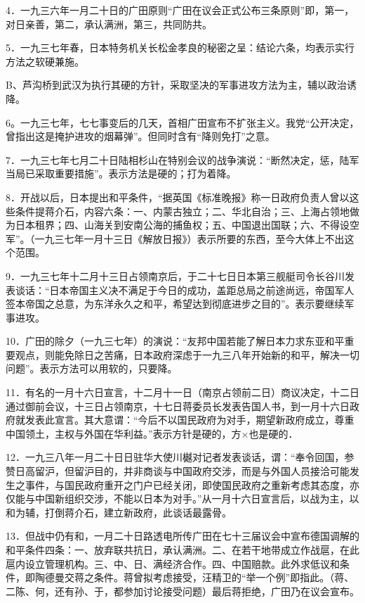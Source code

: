 4．一九三六年一月二十日的广田原则“广田在议会正式公布三条原则”即，第一，对日亲善，第二，承认满洲，第三，共同防共。

5．一九三七年春，日本特务机关长松金孝良的秘密之呈：结论六条，均表示实行方法之软硬兼施。

B、芦沟桥到武汉为执行其硬的方针，采取坚决的军事进攻方法为主，辅以政治诱降。

6。一九三七年，七七事变后的几天，首相广田宣布不扩张主义。我党“公开决定，曾指出这是掩护进攻的烟幕弹”。但同时含有“降则免打”之意。

7．一九三七年七月二十日陆相杉山在特别会议的战争演说：“断然决定，惩，陆军当局已采取重要措施”。表示方法是硬的；打为着降。

8．开战以后，日本提出和平条件，“据英国《标准晚报》称一日政府负责人曾以这些条件提蒋介石，内容六条：一、内蒙古独立；二、华北自治；三、上海占领地做为日本租界；四、山海关到安南公海的捕鱼权；五、中国退出国联；六、不得设空军”。（一九三七年一月十三日《解放日报》）表示所要的东西，至今大体上不出这个范围。

9．一九三七年十二月十三日占领南京后，于二十七日日本第三舰艇司令长谷川发表谈话：“日本帝国主义决不满足于今日的成功，盖距总局之前途尚远，帝国军人签本帝国之总意，为东洋永久之和平，希望达到彻底进步之目的”。表示要继续军事进攻。

10．广田的除夕（一九三七年）的演说：“友邦中国若能了解日本力求东亚和平重要观点，则能免除日之苦痛，日本政府深虑于一九三八年开始新的和平，解决一切问题”。表示方法可以用软的，只要降。

11．有名的一月十六日宣言，十二月十一日（南京占领前二日）商议决定，十二日通过御前会议，十三日占领南京，十七日蒋委员长发表告国人书，到一月十六日政府就发表此宣言。其大意谓：“今后不以国民政府为对手，期望新政府成立，尊重中国领土，主权与外国在华利益。”表示方针是硬的，方×也是硬的．

12．一九三八年一月二十日日驻华大使川樾对记者发表谈话，谓：“奉令回国，参赞日高留沪，但留沪目的，并非商谈与中国政府交涉，而是与外国人员接洽可能发生之事件，与国民政府重开之门户已经关闭，即使国民政府之重新考虑其态度，亦仅能与中国新组织交涉，不能以日本为对手。”从一月十六日宣言后，以战为主，以和为辅，打倒蒋介石，建立新政府，此谈话最露骨。

13．但战中仍有和，一月二十日路透电所传广田在七十三届议会中宣布德国调解的和平条件四条：一、放弃联共抗日，承认满洲。二、在若干地带成立作战扈，在此扈内设立管理机构。三、中、日、满经济合作。四、中国赔款。此外求低议和条件，即陶德曼交蒋之条件。蒋曾拟考虑接受，汪精卫的“举一个例”即指此。（蒋、二陈、何，还有孙、于，都参加讨论接受问题）最后蒋拒绝，广田乃在议会宣布。

